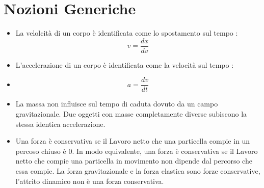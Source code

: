 \documentclass[12pt, a4paper, openany]{book}
\begin{document}
\newpage

\tableofcontents
\newpage

\section*{Nozioni Generiche}

\begin{itemize}
    \item La velolcità di un corpo è identificata come lo spostamento sul tempo
    :
        \begin{equation*}
            v = \frac{dx}{dv}
        \end{equation*}
    \item L'accelerazione di un corpo è identificata come la velocità sul tempo
    :
    \item 
        \begin{equation*}
            a = \frac{dv}{dt}
        \end{equation*}
    \item La massa non influisce sul tempo di caduta dovuto da un campo 
        gravitazionale. Due oggetti con masse completamente diverse subiscono 
        la stessa identica accelerazione.
    \item Una forza è conservativa se il Lavoro netto che una particella compie
    in un percoso chiuso è 0. In modo equivalente, una forza è conservativa 
    se il Lavoro netto che compie una particella in movimento non dipende dal 
    percorso che essa compie. La forza gravitazionale e la forza elastica sono
    forze conservative, l'attrito dinamico non è una forza conservativa.
    

\end{itemize}
\end{document}

